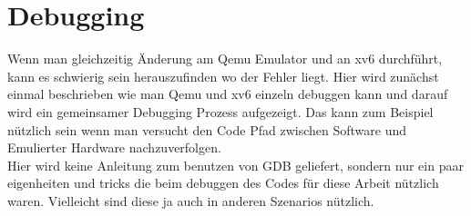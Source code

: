 





\section{Debugging}
Wenn man gleichzeitig Änderung am Qemu Emulator und an xv6 durchführt, kann es schwierig sein
herauszufinden wo der Fehler liegt. Hier wird zunächst einmal beschrieben wie man Qemu und
xv6 einzeln debuggen kann und darauf wird ein gemeinsamer Debugging Prozess aufgezeigt.
Das kann zum Beispiel nützlich sein wenn man versucht den Code Pfad zwischen Software und
Emulierter Hardware nachzuverfolgen.\\
Hier wird keine Anleitung zum benutzen von GDB geliefert, sondern nur ein paar eigenheiten
und tricks die beim debuggen des Codes für diese Arbeit nützlich waren. Vielleicht sind
diese ja auch in anderen Szenarios nützlich.
